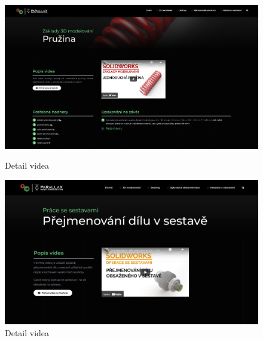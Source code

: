 \begin{figure}[htbp]
    \centering
    \begin{minipage}[b]{0.45\textwidth}
        \centering
        \includegraphics[width=1\textwidth]{img/020/web/web-3D.png}
        \caption{Detail videa}
        \label{fig:p3dportal-3D}
    \end{minipage}
    \qquad
    \begin{minipage}[b]{0.45\textwidth}
        \centering
        \includegraphics[width=1\textwidth]{img/020/web/web-assembly.png}
        \caption{Detail videa}
        \label{fig:p3dportal-assembly}
    \end{minipage}
\end{figure}